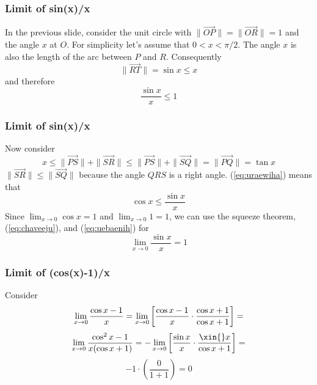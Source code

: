 \documentclass[xcolor=dvipsnames]{beamer}
\begin{document}
\begin{frame}
  \frametitle{Limit of sin(x)/x}
  In the previous slide, consider the unit circle with
  $\|\vec{OP}\|=\|\vec{OR}\|=1$ and the angle $x$ at $O$. For simplicity let's
  assume that $0<x<\pi/2$. The angle $x$ is also the length of the arc
  between $P$ and $R$. Consequently
  \begin{equation}
    \label{eq:iufoobue}
\|\vec{RT}\|=\sin{}x\leq{}x    
  \end{equation}
  and therefore
  \begin{equation}
    \label{eq:chaveeju}
    \frac{\sin{}x}{x}\leq{}1
  \end{equation}
\end{frame}

\begin{frame}
  \frametitle{Limit of sin(x)/x}
  Now consider
  \begin{equation}
    \label{eq:uraewiha}
    x\leq\|\vec{PS}\|+\|\vec{SR}\|\leq\|\vec{PS}\|+\|\vec{SQ}\|=\|\vec{PQ}\|=\tan{}x
  \end{equation}
$\|\vec{SR}\|\leq\|\vec{SQ}\|$ because the angle $QRS$ is a right angle.
(\ref{eq:uraewiha}) means that
\begin{equation}
  \label{eq:uebaenih}
  \cos{}x\leq\frac{\sin{}x}{x}
\end{equation}
Since $\lim_{x\rightarrow{}0}\cos{}x=1$ and $\lim_{x\rightarrow{}0}1=1$, we can use the squeeze
theorem, (\ref{eq:chaveeju}), and (\ref{eq:uebaenih}) for
\begin{equation}
  \label{eq:guabighe}
  \lim_{x\rightarrow{}0}\frac{\sin{}x}{x}=1
\end{equation}
\end{frame}

\begin{frame}
  \frametitle{Limit of (cos(x)-1)/x}
  Consider
  \begin{equation}
    \label{eq:ungaeciz}
    \lim_{x\rightarrow{}0}\frac{\cos{}x-1}{x}=\lim_{x\rightarrow{}0}\left[\frac{\cos{}x-1}{x}\cdot\frac{\cos{}x+1}{\cos{}x+1}\right]=\notag
  \end{equation}
  \begin{equation}
    \label{eq:xiecahze}
    \lim_{x\rightarrow{}0}\frac{\cos^{2}x-1}{x(\cos{}x+1)}=-\lim_{x\rightarrow{}0}\left[\frac{\sin{}x}{x}\cdot\frac{\xin{}x}{\cos{}x+1}\right]=\notag
  \end{equation}
  \begin{equation}
    \label{eq:angoohee}
    -1\cdot\left(\frac{0}{1+1}\right)=0
  \end{equation}
\end{frame}
\end{document}
